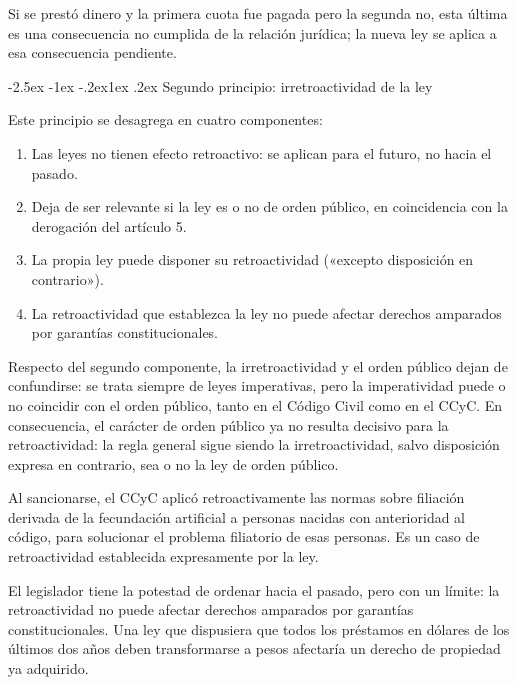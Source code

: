 \documentclass[12pt,oneside]{book}
\makeatletter
\renewcommand\subsection{\@startsection{subsection}{2}{\z@}%
  {-2.5ex \@plus -1ex \@minus -.2ex}{1ex \@plus .2ex}%
  {\normalfont\normalsize\bfseries}}
\makeatother
\begin{document}
\begin{ejemplo}
Si se prestó dinero y la primera cuota fue pagada pero la segunda no, esta última es una consecuencia no cumplida de la relación jurídica; la nueva ley se aplica a esa consecuencia pendiente.
\end{ejemplo}

\subsection{Segundo principio: irretroactividad de la ley}

Este principio se desagrega en cuatro componentes:

\begin{enumerate}
\item Las leyes no tienen efecto retroactivo: se aplican para el futuro, no hacia el pasado.
\item Deja de ser relevante si la ley es o no de orden público, en coincidencia con la derogación del artículo 5.
\item La propia ley puede disponer su retroactividad («excepto disposición en contrario»).
\item La retroactividad que establezca la ley no puede afectar derechos amparados por garantías constitucionales.
\end{enumerate}

Respecto del segundo componente, la irretroactividad y el orden público dejan de confundirse: se trata siempre de leyes imperativas, pero la imperatividad puede o no coincidir con el orden público, tanto en el Código Civil como en el CCyC. En consecuencia, el carácter de orden público ya no resulta decisivo para la retroactividad: la regla general sigue siendo la irretroactividad, salvo disposición expresa en contrario, sea o no la ley de orden público.

\begin{ejemplo}
Al sancionarse, el CCyC aplicó retroactivamente las normas sobre filiación derivada de la fecundación artificial a personas nacidas con anterioridad al código, para solucionar el problema filiatorio de esas personas. Es un caso de retroactividad establecida expresamente por la ley.
\end{ejemplo}

\begin{importante}
El legislador tiene la potestad de ordenar hacia el pasado, pero con un límite: la retroactividad no puede afectar derechos amparados por garantías constitucionales. Una ley que dispusiera que todos los préstamos en dólares de los últimos dos años deben transformarse a pesos afectaría un derecho de propiedad ya adquirido.
\end{importante}
\end{document}
